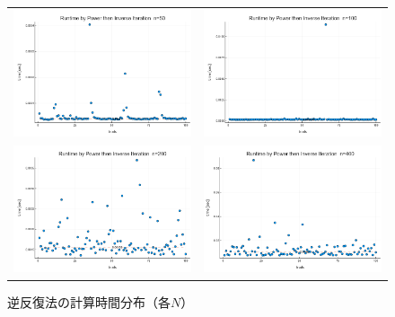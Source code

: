 \documentclass[a4paper,11pt]{ltjsarticle}
\begin{document}
\begin{figure}[H]
  \centering
  \begin{tabular}{cc}
    \includegraphics[width=72mm]{graphs/exp4_n50_time.png} &
    \includegraphics[width=72mm]{graphs/exp4_n100_time.png} \\
    \includegraphics[width=72mm]{graphs/exp4_n200_time.png} &
    \includegraphics[width=72mm]{graphs/exp4_n400_time.png} \\
  \end{tabular}
  \caption{逆反復法の計算時間分布（各$N$）}
  \label{fig:exp4_time}
\end{figure}
\end{document}
